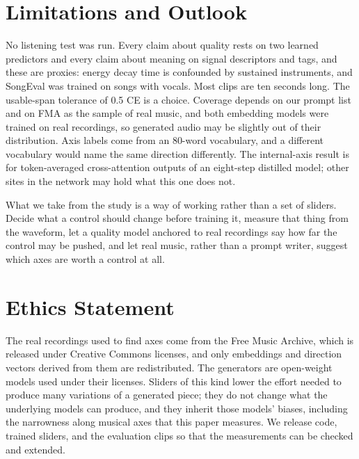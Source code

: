 \section{Limitations and Outlook}

No listening test was run. Every claim about quality rests on two learned predictors and every claim about meaning on signal descriptors and tags, and these are proxies: energy decay time is confounded by sustained instruments, and SongEval was trained on songs with vocals. Most clips are ten seconds long. The usable-span tolerance of 0.5 CE is a choice. Coverage depends on our prompt list and on FMA as the sample of real music, and both embedding models were trained on real recordings, so generated audio may be slightly out of their distribution. Axis labels come from an 80-word vocabulary, and a different vocabulary would name the same direction differently. The internal-axis result is for token-averaged cross-attention outputs of an eight-step distilled model; other sites in the network may hold what this one does not.

What we take from the study is a way of working rather than a set of sliders. Decide what a control should change before training it, measure that thing from the waveform, let a quality model anchored to real recordings say how far the control may be pushed, and let real music, rather than a prompt writer, suggest which axes are worth a control at all.

\section{Ethics Statement}

The real recordings used to find axes come from the Free Music Archive, which is released under Creative Commons licenses, and only embeddings and direction vectors derived from them are redistributed. The generators are open-weight models used under their licenses. Sliders of this kind lower the effort needed to produce many variations of a generated piece; they do not change what the underlying models can produce, and they inherit those models' biases, including the narrowness along musical axes that this paper measures. We release code, trained sliders, and the evaluation clips so that the measurements can be checked and extended.
